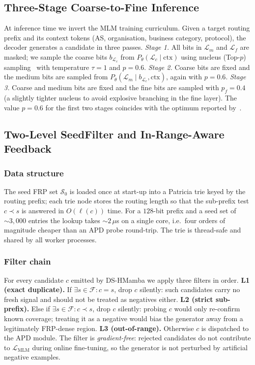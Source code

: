 \documentclass[conference]{IEEEtran}
\begin{document}
\subsection{Three-Stage Coarse-to-Fine Inference}
\label{sec:design:infer}
At inference time we invert the MLM training curriculum.
Given a target routing prefix and its context tokens
(AS, organisation, business category, protocol), the decoder
generates a candidate in three passes.
\emph{Stage 1.}  All bits in $\mathcal{L}_m$ and $\mathcal{L}_f$
are masked; we sample the coarse bits $b_{\mathcal{L}_c}$ from
$P_\theta(\mathcal{L}_c\mid\text{ctx})$ using nucleus (Top-$p$)
sampling~\cite{holtzman2020top-p} with temperature $\tau{=}1$
and $p{=}0.6$.
\emph{Stage 2.}  Coarse bits are fixed and the medium bits are
sampled from
$P_\theta(\mathcal{L}_m\mid b_{\mathcal{L}_c},\text{ctx})$,
again with $p{=}0.6$.
\emph{Stage 3.}  Coarse and medium bits are fixed and the fine
bits are sampled with $p_f{=}0.4$ (a slightly tighter nucleus to
avoid explosive branching in the fine layer).  The value
$p{=}0.6$ for the first two stages coincides with the optimum
reported by~\cite{wei2025gungnir}.

\subsection{Two-Level SeedFilter and In-Range-Aware Feedback}
\label{sec:design:feedback}

\subsubsection{Data structure}
The seed FRP set $\mathcal{S}_{0}$ is loaded once at start-up
into a Patricia trie keyed by the routing prefix; each trie
node stores the routing length so that the sub-prefix test
$c\!\prec\!s$ is answered in $O(\ell(c))$ time.  For a $128$-bit
prefix and a seed set of $\sim\!3{,}000$ entries the lookup takes
$\sim\!2\,\mu$s on a single core, i.e.\ four orders of magnitude
cheaper than an APD probe round-trip.  The trie is thread-safe
and shared by all worker processes.

\subsubsection{Filter chain}
For every candidate $c$ emitted by DS-HMamba we apply three
filters in order.  \textbf{L1 (exact duplicate).}  If
$\exists s\!\in\!\mathcal{F}:c{=}s$, drop $c$ silently: such
candidates carry no fresh signal and should not be treated as
negatives either.  \textbf{L2 (strict sub-prefix).}  Else if
$\exists s\!\in\!\mathcal{F}:c\!\prec\!s$, drop $c$ silently:
probing $c$ would only re-confirm known coverage; treating it
as a negative would bias the generator away from a legitimately
FRP-dense region.  \textbf{L3 (out-of-range).}  Otherwise $c$
is dispatched to the APD module.  The filter is
\emph{gradient-free}: rejected candidates do not contribute to
$\mathcal{L}_{\mathrm{MLM}}$ during online fine-tuning, so the
generator is not perturbed by artificial negative examples.
\end{document}

